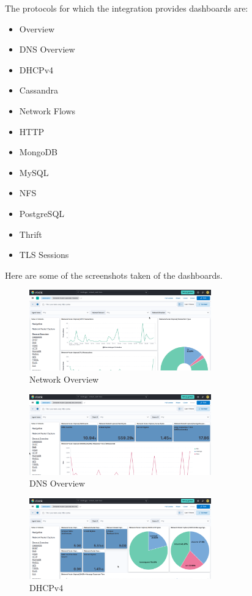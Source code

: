 \documentclass{report}
\begin{document}
The protocols for which the integration provides dashboards are:
\begin{itemize}
	\item Overview
	\item DNS Overview
	\item DHCPv4
	\item Cassandra
	\item Network Flows
	\item HTTP
	\item MongoDB
	\item MySQL
	\item NFS
	\item PostgreSQL
	\item Thrift
	\item TLS Sessions
\end{itemize}
Here are some of the screenshots taken of the dashboards.
\begin{figure}
	\centering
	\includegraphics[width=0.7\textwidth]{Images/dashboard-overview.png}
	\caption{Network Overview}
	\label{fig:Overview}
\end{figure}
\begin{figure}
	\centering
	\includegraphics[width=0.7\textwidth]{Images/dashboard-dns.png}
	\caption{DNS Overview}
	\label{fig:DNS Overview}
\end{figure}
\begin{figure}
	\centering
	\includegraphics[width=0.7\textwidth]{Images/dashboard-dhcp.png}
	\caption{DHCPv4}
	\label{fig:DHCPv4}
\end{figure}
\end{document}
